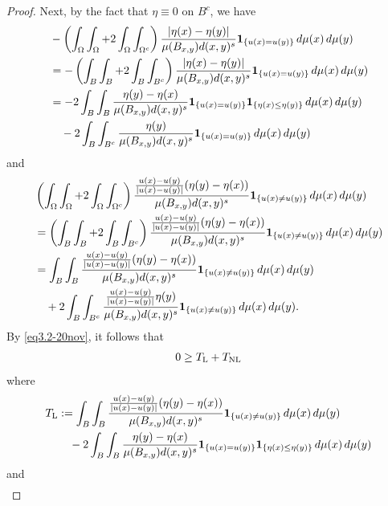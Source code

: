 \documentclass[11pt,leqno]{amsart}
\numberwithin{equation}{section}
\theoremstyle{definition}
\begin{document}
\begin{proof}
		
		
		
		Next, by the fact that $\eta\equiv 0$ on $B^c$, we have
		{
			\begin{align*}
				&- \left( \int_\Omega\int_\Omega +2\int_\Omega\int_{\Omega^c} \right) \frac{ |\eta(x)-\eta(y)| }{\mu(B_{x,y}) d(x,y)^s} {\bf 1}_{\{u(x)=u(y)\}}\,d\mu(x)\,d\mu(y)\\
				&=-  \left( \int_B\int_{B} +2\int_{B}\int_{B^c} \right) \frac{ |\eta(x)-\eta(y)| }{\mu(B_{x,y}) d(x,y)^s} {\bf 1}_{\{u(x)=u(y)\}}\,d\mu(x)\,d\mu(y)\\
				&= -2\int_B\int_{B}  \frac{ \eta(y)-\eta(x) }{\mu(B_{x,y}) d(x,y)^s} {\bf 1}_{\{u(x)=u(y)\}}{\bf 1}_{\{ \eta(x)\leq \eta(y)\}}\,d\mu(x)\,d\mu(y)\notag \\
				&\quad   -2\int_{B} \int_{B^c} \frac{ \eta(y) }{\mu(B_{x,y}) d(x,y)^s} {\bf 1}_{\{u(x)=u(y)\}}\,d\mu(x)\,d\mu(y)
			\end{align*}
			and
			\begin{align*}
				&\left( \int_\Omega\int_\Omega+2\int_{\Omega}\int_{\Omega^c}\right) \frac{\frac{u(x)-u(y)}{|u(x)-u(y)|} (\eta(y)-\eta(x)) }{\mu(B_{x,y}) d(x,y)^s} {\bf 1}_{\{ u(x)\neq u(y)\}}\,d\mu(x)\,d\mu(y)\notag \\
				&= \left( \int_B\int_B+2\int_{B}\int_{B^c}\right) \frac{\frac{u(x)-u(y)}{|u(x)-u(y)|} (\eta(y)-\eta(x)) }{\mu(B_{x,y}) d(x,y)^s} {\bf 1}_{\{ u(x)\neq u(y)\}}\,d\mu(x)\,d\mu(y)\notag \\
				&= \int_B\int_B\frac{\frac{u(x)-u(y)}{|u(x)-u(y)|} (\eta(y)-\eta(x)) }{\mu(B_{x,y}) d(x,y)^s} {\bf 1}_{\{ u(x)\neq u(y)\}}\,d\mu(x)\,d\mu(y)  \notag  \\
				&\quad +2\int_{B}\int_{B^c} \frac{\frac{u(x)-u(y)}{|u(x)-u(y)|} \eta(y) }{\mu(B_{x,y}) d(x,y)^s} {\bf 1}_{\{ u(x)\neq u(y)\}}\,d\mu(x)\,d\mu(y).
			\end{align*}
			By \eqref{eq3.2-20nov}, it follows that
			\begin{align}\label{eq1-2oct}
				0\geq T_{\rm L} + T_{\rm NL}
			\end{align}
			where 
			\begin{align*}
				T_{\rm L} &:=  \int_B\int_B\frac{\frac{u(x)-u(y)}{|u(x)-u(y)|} (\eta(y)-\eta(x)) }{\mu(B_{x,y}) d(x,y)^s} {\bf 1}_{\{ u(x)\neq u(y)\}}\,d\mu(x)\,d\mu(y) \\
				& \quad -2\int_B\int_{B}  \frac{ \eta(y)-\eta(x) }{\mu(B_{x,y}) d(x,y)^s} {\bf 1}_{\{u(x)=u(y)\}}{\bf 1}_{\{ \eta(x)\leq \eta(y)\}}\,d\mu(x)\,d\mu(y)
			\end{align*}
			and
			\begin{align*}

\end{align*}}
\end{proof}
\end{document}
